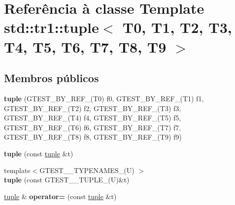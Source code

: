 \hypertarget{classstd_1_1tr1_1_1tuple}{\section{Referência à classe Template std\-:\-:tr1\-:\-:tuple$<$ T0, T1, T2, T3, T4, T5, T6, T7, T8, T9 $>$}
\label{classstd_1_1tr1_1_1tuple}
}
\subsection*{Membros públicos}
\begin{DoxyCompactItemize}
\item 
\hypertarget{classstd_1_1tr1_1_1tuple_a5c31ee8e6f548fc37ef814d3db7d273f}{{\bfseries tuple} (G\-T\-E\-S\-T\-\_\-\-B\-Y\-\_\-\-R\-E\-F\-\_\-(T0) f0, G\-T\-E\-S\-T\-\_\-\-B\-Y\-\_\-\-R\-E\-F\-\_\-(T1) f1, G\-T\-E\-S\-T\-\_\-\-B\-Y\-\_\-\-R\-E\-F\-\_\-(T2) f2, G\-T\-E\-S\-T\-\_\-\-B\-Y\-\_\-\-R\-E\-F\-\_\-(T3) f3, G\-T\-E\-S\-T\-\_\-\-B\-Y\-\_\-\-R\-E\-F\-\_\-(T4) f4, G\-T\-E\-S\-T\-\_\-\-B\-Y\-\_\-\-R\-E\-F\-\_\-(T5) f5, G\-T\-E\-S\-T\-\_\-\-B\-Y\-\_\-\-R\-E\-F\-\_\-(T6) f6, G\-T\-E\-S\-T\-\_\-\-B\-Y\-\_\-\-R\-E\-F\-\_\-(T7) f7, G\-T\-E\-S\-T\-\_\-\-B\-Y\-\_\-\-R\-E\-F\-\_\-(T8) f8, G\-T\-E\-S\-T\-\_\-\-B\-Y\-\_\-\-R\-E\-F\-\_\-(T9) f9)}\label{classstd_1_1tr1_1_1tuple_a5c31ee8e6f548fc37ef814d3db7d273f}

\item 
\hypertarget{classstd_1_1tr1_1_1tuple_a70a4e487f56c2f544a40ca81e1b69303}{{\bfseries tuple} (const \hyperlink{classstd_1_1tr1_1_1tuple}{tuple} \&t)}\label{classstd_1_1tr1_1_1tuple_a70a4e487f56c2f544a40ca81e1b69303}

\item 
\hypertarget{classstd_1_1tr1_1_1tuple_a3ecd978bce485352717c801af8a6e113}{{\footnotesize template$<$G\-T\-E\-S\-T\-\_\-\_\-\-T\-Y\-P\-E\-N\-A\-M\-E\-S\-\_\-(\-U) $>$ }\\{\bfseries tuple} (const G\-T\-E\-S\-T\-\_\-\_\-\-T\-U\-P\-L\-E\-\_\-(U)\&t)}\label{classstd_1_1tr1_1_1tuple_a3ecd978bce485352717c801af8a6e113}

\item 
\hypertarget{classstd_1_1tr1_1_1tuple_a2544141b07a65060937e594228ee815a}{\hyperlink{classstd_1_1tr1_1_1tuple}{tuple} \& {\bfseries operator=} (const \hyperlink{classstd_1_1tr1_1_1tuple}{tuple} \&t)}\label{classstd_1_1tr1_1_1tuple_a2544141b07a65060937e594228ee815a}


\end{DoxyCompactItemize}
